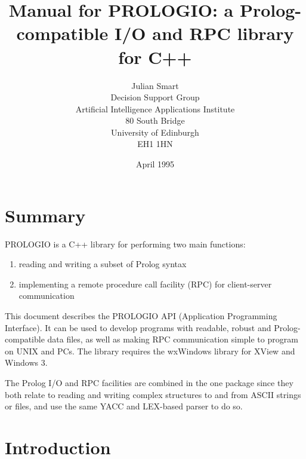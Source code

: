 \parindent 0pt
\parskip 11pt
\title{Manual for PROLOGIO: a Prolog-compatible I/O and RPC library for C++}
\author{Julian Smart\\Decision Support Group\\Artificial Intelligence Applications Institute\\80 South Bridge\\University of Edinburgh\\EH1 1HN}
\date{April 1995}
%
\makeindex

\maketitle
%
\pagestyle{fancyplain}

\setfooter{\thepage}{}{}{}{}{\thepage}
\tableofcontents%
\newpage%
%

\chapter*{Summary}
%
\setfooter{\thepage}{}{}{}{}{\thepage}

PROLOGIO is a C++ library for performing two main functions:

\begin{enumerate}
\item reading and writing a subset of Prolog syntax
\item implementing a remote procedure call facility (RPC) for
client-server communication
\end{enumerate}

This document describes the PROLOGIO API (Application Programming
Interface). It can be used to develop programs with readable, robust and
Prolog-compatible data files, as well as making RPC communication simple
to program on UNIX and PCs. The library requires the wxWindows library
for XView and Windows 3.

The Prolog I/O and RPC facilities are combined in the one package since
they both relate to reading and writing complex structures to and from
ASCII strings or files, and use the same YACC and LEX-based parser to do
so.

\chapter{Introduction}
%
%
\setfooter{\thepage}{}{}{}{}{\thepage}

